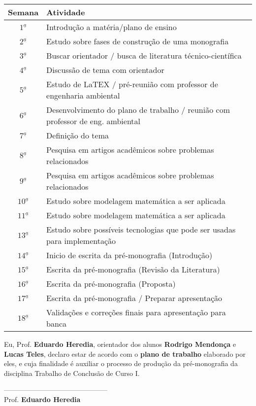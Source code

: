 \documentclass[12pt]{article}
\begin{document}
\begin{center}
\begin{tabular}{ |c| p{15.5cm} | }
	\hline
	\textbf{Semana} & \textbf{Atividade} \\ \hline \hline
	$1^{\underline a}$ & Introdução a matéria/plano de ensino \\ \hline
	$2^{\underline a}$ & Estudo sobre fases de construção de uma monografia \\ \hline
	$3^{\underline a}$ & Buscar orientador / busca de literatura técnico-científica \\ \hline		
	$4^{\underline a}$ & Discussão de tema com orientador \\ \hline		
	$5^{\underline a}$ & Estudo de LaTEX / pré-reunião com professor de engenharia ambiental \\ \hline		
	$6^{\underline a}$ & Desenvolvimento do plano de trabalho / reunião com professor de eng. ambiental \\ \hline		
	$7^{\underline a}$ & Definição do tema \\ \hline		
	$8^{\underline a}$ & Pesquisa em artigos acadêmicos sobre problemas relacionados \\ \hline		
	$9^{\underline a}$ & Pesquisa em artigos acadêmicos sobre problemas relacionados \\ \hline		
	$10^{\underline a}$ & Estudo sobre modelagem matemática a ser aplicada \\ \hline		
	$11^{\underline a}$ & Estudo sobre modelagem matemática a ser aplicada \\ \hline		
	$13^{\underline a}$ & Estudo sobre possíveis tecnologias que pode ser usadas para implementação \\ \hline		
	$14^{\underline a}$ & Inicio de escrita da pré-monografia (Introdução) \\ \hline		
	$15^{\underline a}$ & Escrita da pré-monografia (Revisão da Literatura)\\ \hline		
	$16^{\underline a}$ & Escrita da pré-monografia (Proposta)\\ \hline		
	$17^{\underline a}$ & Escrita da pré-monografia / Preparar apresentação \\ \hline		
	$18^{\underline a}$ & Validações e correções finais para apresentação para banca \\ \hline
\end{tabular}
\end{center}

\vspace{1.25cm}

\noindent
Eu, Prof. \textbf{Eduardo Heredia}, orientador dos alunos \textbf{Rodrigo Mendonça}  e \textbf{Lucas Teles}, declaro estar de acordo com o \textbf{plano de trabalho} elaborado por eles, e cuja finalidade é auxiliar o processo de produção da pré-monografia da disciplina Trabalho de Conclusão de Curso I. 

\vspace{1.75cm}

\begin{center}
	
	---------------------------------------------\\
	Prof. \textbf{Eduardo Heredia}
\end{center}
\end{document}
